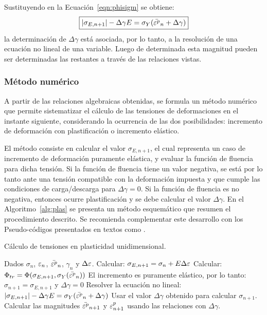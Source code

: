 Sustituyendo en la Ecuación~\eqref{eqn:phisigm} se obtiene:
%
\begin{equation}\label{eqn:eqplasgamma}
\boxed{
|\sigma_{E,n+1}|- \Delta \gamma E = \sigma_Y ( \bar{ \varepsilon^p}_{n} + \Delta \gamma ) }
\end{equation}
%
la determinación de $\Delta \gamma$ está asociada, por lo tanto, a la resolución de una ecuación no lineal de una variable. %
%
Luego de determinada esta magnitud pueden ser determinadas las restantes a través de las relaciones vistas.

\subsubsection{Método numérico}

A partir de las relaciones algebraicas obtenidas, se formula un método numérico que permite sistematizar el cálculo de las tensiones de deformaciones en el instante siguiente, considerando la ocurrencia de las dos posibilidades: incremento de deformación con plastificación o incremento elástico. %


El método consiste en calcular el valor $\sigma_{E,n+1}$, el cual representa un caso de incremento de deformación puramente elástica, y evaluar la función de fluencia para dicha tensión. %
%
Si la función de fluencia tiene un valor negativa, se está por lo tanto ante una tensión compatible con la deformación impuesta y que cumple las condiciones de carga/descarga para $\Delta \gamma=0$. %
%
Si la función de fluencia es no negativa, entonces ocurre plastificación y se debe calcular el valor $\Delta \gamma$. %
En el Algoritmo~\ref{alg:plas} se presenta un método esquemático que resumen el procedimiento descrito. %
%
Se recomienda complementar este desarrollo con los Pseudo-códigos presentados en textos como \citep{Simo1998}.

\begin{algorithm}
	\caption{Cálculo de tensiones en plasticidad unidimensional.}
	\label{alg:plas}
	\begin{algorithmic}[1]
		\STATE Dados $\sigma_n$, $\varepsilon_n$, $\bar{ \varepsilon^p}_n$, $\gamma_n$ y $\Delta \varepsilon$. %
		\STATE Calcular: $\sigma_{E,n+1} = \sigma_n + E \Delta \varepsilon$
		\STATE Calcular: $\Phi_{tr} = \Phi(\sigma_{E,n+1},\sigma_Y(\bar{ \varepsilon^p}_{n} ) )$
		\STATE El incremento es puramente elástico, por lo tanto: $\sigma_{n+1}= \sigma_{E,n+1}$ y $\Delta \gamma =0$  
		\ELSE
		 \STATE Resolver la ecuación no lineal:
		 $ |\sigma_{E,n+1}|- \Delta \gamma E = \sigma_Y ( \bar{ \varepsilon^p}_{n} + \Delta \gamma )$ 
		\STATE Usar el valor $\Delta \gamma$ obtenido para calcular $\sigma_{n+1}$.
		\ENDIF
		\STATE Calcular las magnitudes $\bar{ \varepsilon^p}_{n+1}$ y $\varepsilon^p_{n+1}$ usando las relaciones con $\Delta \gamma$.
	\end{algorithmic}
\end{algorithm}


